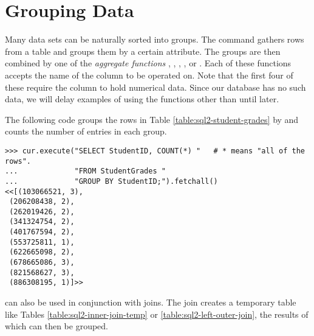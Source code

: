 \section*{Grouping Data} %


Many data sets can be naturally sorted into groups.
The  command gathers rows from a table and groups them by a certain attribute.
The groups are then combined by one of the \emph{aggregate functions} , , , , or .
Each of these functions accepts the name of the column to be operated on.
Note that the first four of these require the column to hold numerical data.
Since our database has no such data, we will delay examples of using the functions other than  until later.

The following code groups the rows in Table \ref{table:sql2-student-grades} by  and counts the number of entries in each group.

\begin{lstlisting}
>>> cur.execute("SELECT StudentID, COUNT(*) "   # * means "all of the rows".
...             "FROM StudentGrades "
...             "GROUP BY StudentID;").fetchall()
<<[(103066521, 3),
 (206208438, 2),
 (262019426, 2),
 (341324754, 2),
 (401767594, 2),
 (553725811, 1),
 (622665098, 2),
 (678665086, 3),
 (821568627, 3),
 (886308195, 1)]>>
\end{lstlisting}

 can also be used in conjunction with joins.
The join creates a temporary table like Tables \ref{table:sql2-inner-join-temp} or \ref{table:sql2-left-outer-join}, the results of which can then be grouped.

